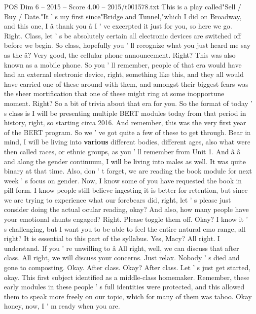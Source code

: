 \begin{textsample}{POS Dim 6 – 2015 – Score 4.00 – 2015/t001578.txt}  \label{ex:f6_pos_050}
This is a play called"Sell / Buy / Date."It ' s my first since"Bridge and Tunnel,"which I did on Broadway, and this one, I â thank you â I ' ve excerpted it just for you, so here we go.
Right.
Class, let ' s be absolutely certain all electronic devices are switched off before we begin.
So class, hopefully you ' ll recognize what you just heard me say as the â?
Very good, the cellular phone announcement.
Right?
This was also known as a mobile phone.
So you ' ll remember, people of that era would have had an external electronic device, right, something like this, and they all would have carried one of these around with them, and amongst their biggest fears was the sheer mortification that one of these might ring at some inopportune moment.
Right?
So a bit of trivia about that era for you.
So the format of today ' s class is I will be presenting multiple BERT modules today from that period in history, right, so starting circa 2016.
And remember, this was the very first year of the BERT program.
So we ' ve got quite a few of these to get through.
Bear in mind, I will be living into \textbf{various} different bodies, different ages, also what were then called races, or ethnic groups, as you ' ll remember from Unit 1.
And â â and along the gender continuum, I will be living into males as well.
It was quite binary at that time.
Also, don ' t forget, we are reading the book module for next week ' s focus on gender.
Now, I know some of you have requested the book in pill form.
I know people still believe ingesting it is better for retention, but since we are trying to experience what our forebears did, right, let ' s please just consider doing the actual ocular reading, okay?
And also, how many people have your emotional shunts engaged?
Right.
Please toggle them off.
Okay?
I know it ' s challenging, but I want you to be able to feel the entire natural emo range, all right?
It is essential to this part of the syllabus.
Yes, Macy?
All right.
I understand.
If you ' re unwilling to â All right, well, we can discuss that after class.
All right, we will discuss your concerns.
Just relax.
Nobody ' s died and gone to composting.
Okay.
After class.
Okay?
After class.
Let ' s just get started, okay.
This first subject identified as a middle-class homemaker.
Remember, these early modules in these people ' s full identities were protected, and this allowed them to speak more freely on our topic, which for many of them was taboo.
Okay honey, now, I ' m ready when you are.

\end{textsample}
